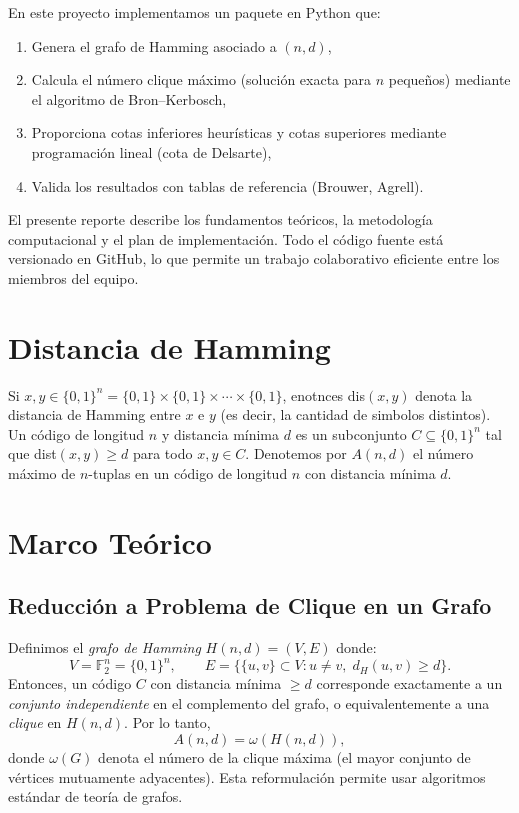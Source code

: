 \documentclass[12pt, spanish]{article}
\begin{document}
En este proyecto implementamos un paquete en Python que:
\begin{enumerate}
    \item Genera el grafo de Hamming asociado a $(n,d)$,
    \item Calcula el número clique máximo (solución exacta para $n$ pequeños) mediante el algoritmo de Bron–Kerbosch,
    \item Proporciona cotas inferiores heurísticas y cotas superiores mediante programación lineal (cota de Delsarte),
    \item Valida los resultados con tablas de referencia (Brouwer, Agrell).
\end{enumerate}
El presente reporte describe los fundamentos teóricos, la metodología computacional y el plan de implementación. Todo el código fuente está versionado en GitHub, lo que permite un trabajo colaborativo eficiente entre los miembros del equipo.
\section{Distancia de Hamming}
\noindent
  Si $x,y \in \{0, 1\}^{n} = \{0, 1\}\times\{0, 1\}\times\cdots\times\{0, 1\}$, enotnces
  dis$(x,y)$ denota la distancia de Hamming entre $x$ e $y$ (es decir, la cantidad de 
  simbolos distintos). Un  c\'odigo de longitud $n$ y distancia m\'inima $d$ es un 
  subconjunto $C \subseteq \{0, 1\}^{n}$ tal que dist$(x,y) \geq d$ para todo $x,y \in C$.
  Denotemos por $A(n, d)$ el n\'umero m\'aximo de $n$-tuplas en un c\'odigo de longitud $n$ 
  con distancia m\'inima $d$.

\section{Marco Teórico}
\label{sec:teoria}

\subsection{Reducción a Problema de Clique en un Grafo}
\label{sub:grafo}
Definimos el \textit{grafo de Hamming} $H(n,d) = (V,E)$ donde:
\[
V = \mathbb{F}_2^n = \{0,1\}^n,\qquad 
E = \{ \{u,v\} \subset V : u\neq v,\; d_H(u,v) \ge d \}.
\]
Entonces, un código $C$ con distancia mínima $\ge d$ corresponde exactamente a un \textit{conjunto independiente} en el complemento del grafo, o equivalentemente a una \textit{clique} en $H(n,d)$. Por lo tanto,
\[
A(n,d) = \omega(H(n,d)),
\]
donde $\omega(G)$ denota el número de la clique máxima (el mayor conjunto de vértices mutuamente adyacentes). Esta reformulación permite usar algoritmos estándar de teoría de grafos.
\end{document}
